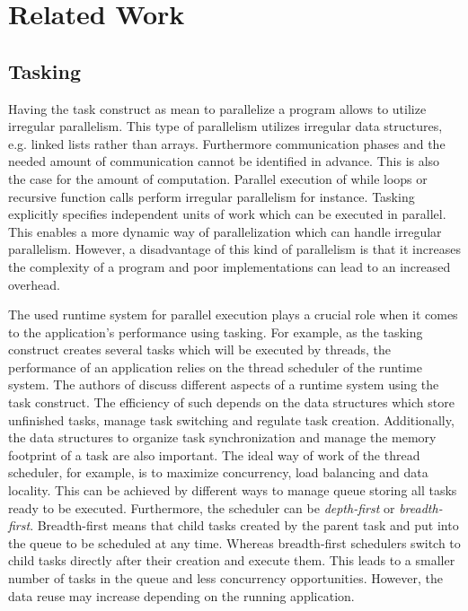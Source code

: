 \section{Related Work}
\label{sec:RelWork}

\subsection{Tasking}
\label{subsec:Tasking}
  Having the task construct as mean to parallelize a program allows to utilize irregular parallelism.
  This type of parallelism utilizes irregular data structures, e.g. linked lists rather than arrays.
  Furthermore communication phases and the needed amount of communication cannot be identified in advance.
  This is also the case for the amount of computation.\cite{Chakrabarti.1993}
  Parallel execution of while loops or recursive function calls perform irregular parallelism for instance.
  Tasking explicitly specifies independent units of work which can be executed in parallel.
  This enables a more dynamic way of parallelization which can handle irregular parallelism.
  However, a disadvantage of this kind of parallelism is that it increases the complexity of a program and poor implementations can lead to an increased overhead.~\cite{Ayguade.2009}~\cite{LaGrone.2011} 
  
  The used runtime system for parallel execution plays a crucial role when it comes to the application's performance using tasking. 
  For example, as the tasking construct creates several tasks which will be executed by threads, the performance of an application relies on the thread scheduler of the runtime system.
  The authors of \cite{LaGrone.2011} discuss different aspects of a runtime system using the task construct.
  The efficiency of such depends on the data structures which store unfinished tasks, manage task switching and regulate task creation.
  Additionally, the data structures to organize task synchronization and manage the memory footprint of a task are also important.
  The ideal way of work of the thread scheduler, for example, is to maximize concurrency, load balancing and data locality.
  This can be achieved by different ways to manage queue storing all tasks ready to be executed.
  Furthermore, the scheduler can be \textit{depth-first} or \textit{breadth-first}.
  Breadth-first means that child tasks created by the parent task and put into the queue to be scheduled at any time.
  Whereas breadth-first schedulers switch to child tasks directly after their creation and execute them.
  This leads to a smaller number of tasks in the queue and less concurrency opportunities.
  However, the data reuse may increase depending on the running application.
 
